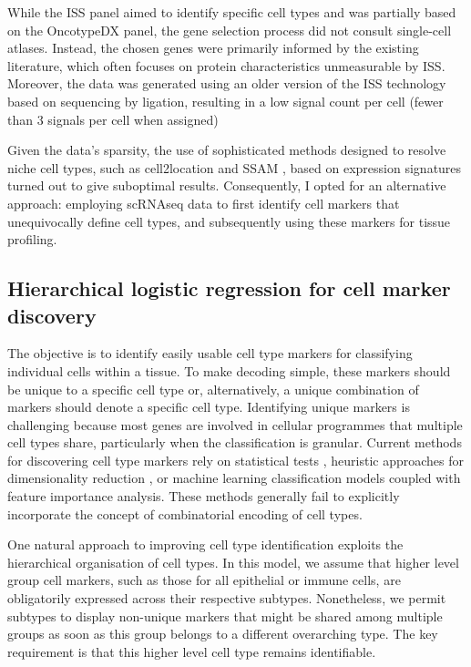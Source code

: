While the \ac{ISS} panel aimed to identify specific cell types and was partially based on the OncotypeDX panel, the gene selection process did not consult single-cell atlases. Instead, the chosen genes were primarily informed by the existing literature, which often focuses on protein characteristics unmeasurable by \ac{ISS}. Moreover, the data was generated using an older version of the \ac{ISS} technology based on sequencing by ligation, resulting in a low signal count per cell (fewer than 3 signals per cell when assigned) 

Given the data's sparsity, the use of sophisticated methods designed to resolve niche cell types, such as cell2location \parencite{Kleshchevnikov2022-ub} and SSAM \parencite{Park2021-hi}, based on expression signatures turned out to give suboptimal results. Consequently, I opted for an alternative approach: employing \ac{scRNAseq} data to first identify cell markers that unequivocally define cell types, and subsequently using these markers for tissue profiling.

\subsection{Hierarchical logistic regression for cell marker discovery}
\label{sec:modalities-schierarchy}


The objective is to identify easily usable cell type markers for classifying individual cells within a tissue. To make decoding simple, these markers should be unique to a specific cell type or, alternatively, a unique combination of markers should denote a specific cell type. Identifying unique markers is challenging because most genes are involved in cellular programmes that multiple cell types share, particularly when the classification is granular. Current methods for discovering cell type markers rely on statistical tests \parencite{Wolf2018-kx}, heuristic approaches for dimensionality reduction \parencite{Dumitrascu2021-dg, Dai2022-ve, Missarova2021-vg}, or machine learning classification models \parencite{Nelson2022-vg} coupled with feature importance analysis. These methods generally fail to explicitly incorporate the concept of combinatorial encoding of cell types.

One natural approach to improving cell type identification exploits the hierarchical organisation of cell types. In this model, we assume that higher level group cell markers, such as those for all epithelial or immune cells, are obligatorily expressed across their respective subtypes. Nonetheless, we permit subtypes to display non-unique markers that might be shared among multiple groups as soon as this group belongs to a different overarching type. The key requirement is that this higher level cell type remains identifiable.

